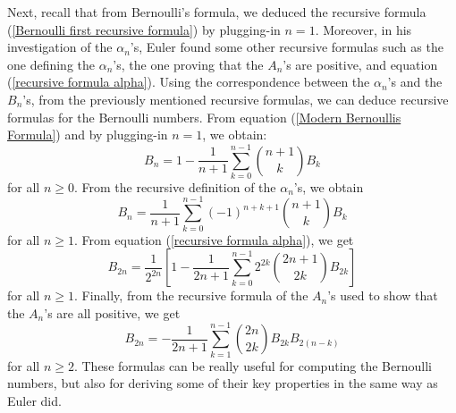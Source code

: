 Next, recall that from Bernoulli's formula, we deduced the recursive formula (\ref{Bernoulli first recursive formula}) by plugging-in $n = 1$. Moreover, in his investigation of the $\alpha_n$'s, Euler found some other recursive formulas such as the one defining the $\alpha_n$'s, the one proving that the $A_n$'s are positive, and equation (\ref{recursive formula alpha}). Using the correspondence between the $\alpha_n$'s and the $B_n$'s, from the previously mentioned recursive formulas, we can deduce recursive formulas for the Bernoulli numbers. From equation (\ref{Modern Bernoullis Formula}) and by plugging-in $n = 1$, we obtain:
\begin{equation} \label{recursive formula bernoulli 1}
    B_n = 1 - \frac{1}{n+1}\sum_{k=0}^{n-1}\binom{n+1}{k}B_k
\end{equation}
for all $n \geq 0$. From the recursive definition of the $\alpha_n$'s, we obtain
\begin{equation} \label{recursive formula bernoulli 2}
    B_n = \frac{1}{n+1}\sum_{k=0}^{n-1}(-1)^{n+k+1}\binom{n+1}{k}B_k
\end{equation}
for all $n \geq 1$. From equation (\ref{recursive formula alpha}), we get
\begin{equation} \label{recursive formula bernoulli 3}
    B_{2n} = \frac{1}{2^{2n}}\left[1 - \frac{1}{2n+1}\sum_{k=0}^{n-1}2^{2k}\binom{2n+1}{2k}B_{2k}\right]
\end{equation}
for all $n \geq 1$. Finally, from the recursive formula of the $A_n$'s used to show that the $A_n$'s are all positive, we get
\begin{equation} \label{recursive formula bernoulli 4}
    B_{2n} = - \frac{1}{2n+1}\sum_{k=1}^{n-1}\binom{2n}{2k}B_{2k}B_{2(n-k)}
\end{equation}
for all $n \geq 2$. These formulas can be really useful for computing the Bernoulli numbers, but also for deriving some of their key properties in the same way as Euler did. 

